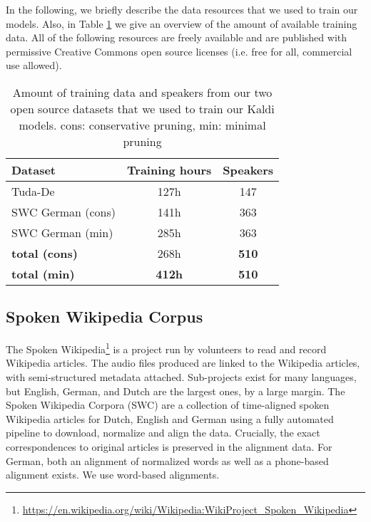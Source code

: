 \documentclass[a4paper]{article}
\begin{document}
In the following, we briefly describe the data resources that we used to train our models. Also, in Table \ref{tab:trainingdatalength} we give an overview of the amount of available training data. All of the following resources are freely available and are published with permissive Creative Commons open source licenses (i.e. free for all, commercial use allowed).




\begin{table}[t]
  \centering
  \begin{tabular}{lcc}
    \toprule
\textbf{Dataset} &    \textbf{Training hours} &  \textbf{Speakers} \\  
    \midrule
Tuda-De & 127h & 147 \\
SWC German (cons) & 141h & 363 \\
SWC German  (min) & 285h & 363 \\
    \midrule
\textbf{total (cons)} & 268h & \textbf{510} \\
\textbf{total (min)} & \textbf{412h} & \textbf{510} \\
    \bottomrule
  \end{tabular}
  \caption{Amount of training data and speakers from our two open source datasets that we used to train our Kaldi models. cons: conservative pruning, min: minimal pruning}
  \label{tab:trainingdatalength}
\end{table}

\subsection{Spoken Wikipedia Corpus}
\label{sec:swc}

The Spoken
Wikipedia\footnote{\url{https://en.wikipedia.org/wiki/Wikipedia:WikiProject_Spoken_Wikipedia}}
is a project run by volunteers to read and record Wikipedia articles.
The audio files produced are linked to the Wikipedia articles,
with semi-structured metadata attached.  Sub-projects exist for many
languages, but English, German, and Dutch are the largest ones, by a
large margin.
The Spoken Wikipedia Corpora \cite{Baumann2018} (SWC) are a collection of
time-aligned spoken Wikipedia articles for Dutch, English and German
using a fully automated pipeline to download, normalize and
align the data.  Crucially, the exact correspondences to original
articles is preserved in the alignment data.  For German, both an
alignment of normalized words as well as a phone-based alignment
exists. We use word-based alignments.
\end{document}
